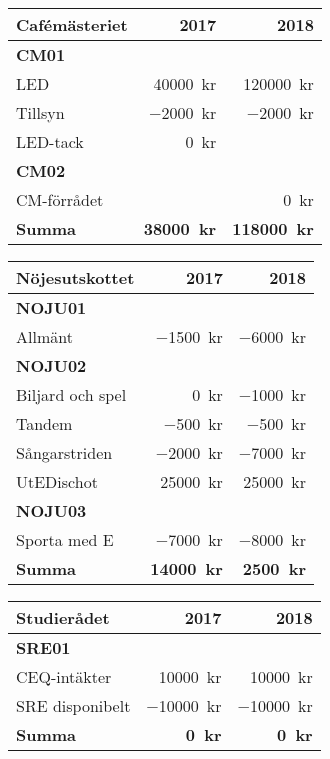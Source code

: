 \documentclass[../_main/handlingar.tex]{subfiles}
\begin{document}
\begin{tabularx}{10cm}{X r r}
    \textbf{\large Cafémästeriet} & \textbf{2017} & \textbf{2018} \\
    \hline
    \textbf{CM01} \\
    LED & \SI{40000}{kr} & \SI{120000}{kr} \\
    Tillsyn & \SI{-2000}{kr} & \SI{-2000}{kr} \\
    LED-tack & \SI{0}{kr} & \\
    \textbf{CM02} \\
    CM-förrådet & & \SI{0}{kr} \\
    \hline
    \textbf{Summa} & \textbf{\SI{38000}{kr}} & \textbf{\SI{118000}{kr}} \\
\end{tabularx}

\begin{tabularx}{10cm}{X r r}
    \textbf{\large Nöjesutskottet} & \textbf{2017} & \textbf{2018} \\
    \hline
    \textbf{NOJU01} \\
    Allmänt & \SI{-1500}{kr} & \SI{-6000}{kr} \\
    \textbf{NOJU02} \\
    Biljard och spel & \SI{0}{kr} & \SI{-1000}{kr} \\
    Tandem & \SI{-500}{kr} & \SI{-500}{kr} \\
    Sångarstriden & \SI{-2000}{kr} & \SI{-7000}{kr} \\
    UtEDischot & \SI{25000}{kr} & \SI{25000}{kr} \\
    \textbf{NOJU03} \\
    Sporta med E & \SI{-7000}{kr} & \SI{-8000}{kr} \\
    \hline
    \textbf{Summa} & \textbf{\SI{14000}{kr}} & \textbf{\SI{2500}{kr}} \\
\end{tabularx}

\begin{tabularx}{10cm}{X r r}
    \textbf{\large Studierådet} & \textbf{2017} & \textbf{2018} \\
    \hline
    \textbf{SRE01} \\
    CEQ-intäkter & \SI{10000}{kr} & \SI{10000}{kr} \\
    SRE disponibelt & \SI{-10000}{kr} & \SI{-10000}{kr} \\
    \hline
    \textbf{Summa} & \textbf{\SI{0}{kr}} & \textbf{\SI{0}{kr}} \\
\end{tabularx}
\end{document}
